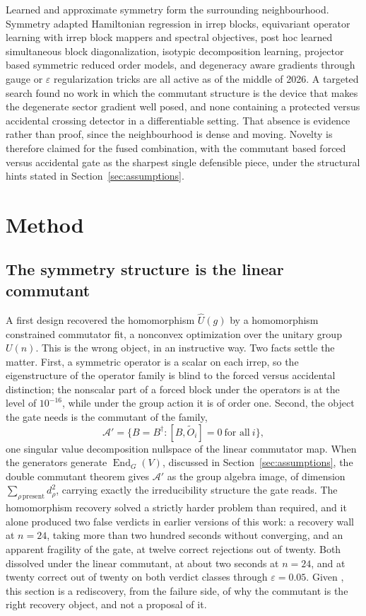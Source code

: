 \documentclass[10pt,a4paper]{amsart}
\newcommand{\comm}[2]{[#1,#2]}
\newcommand{\End}{\operatorname{End}}
\begin{document}
Learned and approximate symmetry form the surrounding neighbourhood. Symmetry
adapted Hamiltonian regression in irrep blocks, equivariant operator learning
with irrep block mappers and spectral objectives, post hoc learned simultaneous
block diagonalization, isotypic decomposition learning, projector based
symmetric reduced order models, and degeneracy aware gradients through gauge or
$\varepsilon$ regularization tricks are all active as of the middle of 2026. A
targeted search found no work in which the commutant structure is the device
that makes the degenerate sector gradient well posed, and none containing a
protected versus accidental crossing detector in a differentiable setting. That
absence is evidence rather than proof, since the neighbourhood is dense and
moving. Novelty is therefore claimed for the fused combination, with the
commutant based forced versus accidental gate as the sharpest single defensible
piece, under the structural hints stated in Section~\ref{sec:assumptions}.

\section{Method}
\subsection{The symmetry structure is the linear commutant}
A first design recovered the homomorphism $\hat U(g)$ by a homomorphism
constrained commutator fit, a nonconvex optimization over the unitary group
$U(n)$. This is the wrong object, in an instructive way. Two facts settle the
matter. First, a symmetric operator is a scalar on each irrep, so the
eigenstructure of the operator family is blind to the forced versus accidental
distinction; the nonscalar part of a forced block under the operators is at the
level of $10^{-16}$, while under the group action it is of order one. Second, the
object the gate needs is the commutant of the family,
\[
\mathcal{A}'=\{B=B^\dagger:\comm{B}{\tilde O_i}=0\ \text{for all}\ i\},
\]
one singular value decomposition nullspace of the linear commutator map. When the
generators generate $\End_G(V)$, discussed in Section~\ref{sec:assumptions}, the
double commutant theorem gives $\mathcal{A}'$ as the group algebra image, of
dimension $\sum_{\rho\,\mathrm{present}}d_\rho^2$, carrying exactly the
irreducibility structure the gate reads. The homomorphism recovery solved a
strictly harder problem than required, and it alone produced two false verdicts
in earlier versions of this work: a recovery wall at $n=24$, taking more than two
hundred seconds without converging, and an apparent fragility of the gate, at
twelve correct rejections out of twenty. Both dissolved under the linear
commutant, at about two seconds at $n=24$, and at twenty correct out of twenty on
both verdict classes through $\varepsilon=0.05$. Given \cite{MM2011}, this section
is a rediscovery, from the failure side, of why the commutant is the right
recovery object, and not a proposal of it.
\end{document}

